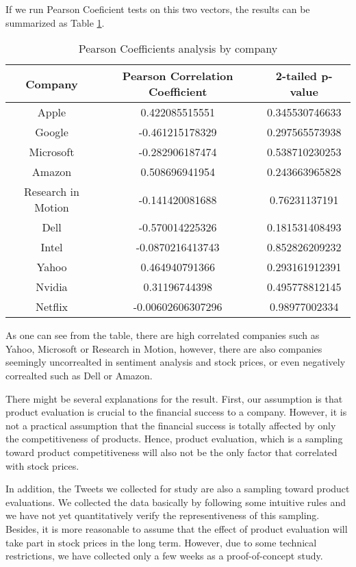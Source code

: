 \documentclass[12pt]{article}
\begin{document}
If we run Pearson Coeficient tests on this two vectors, the results can be summarized as Table \ref{coefficients-by-company}.

\begin{table}
\begin{center}
    \begin{tabular}{ | c || c | c | }
        \hline
        \textbf{Company} & \textbf{Pearson Correlation Coefficient} & \textbf{2-tailed p-value} \\ \hline
        \hline
        Apple & 0.422085515551 & 0.345530746633 \\ \hline
        Google & -0.461215178329 & 0.297565573938 \\ \hline
        Microsoft & -0.282906187474 & 0.538710230253 \\ \hline
        Amazon & 0.508696941954 & 0.243663965828 \\ \hline
        Research in Motion & -0.141420081688 & 0.76231137191 \\ \hline
        Dell & -0.570014225326 & 0.181531408493 \\ \hline
        Intel & -0.0870216413743 & 0.852826209232 \\ \hline
        Yahoo & 0.464940791366 & 0.293161912391 \\ \hline
        Nvidia & 0.31196744398 & 0.495778812145 \\ \hline
        Netflix & -0.00602606307296 & 0.98977002334 \\ \hline
    \end{tabular}
\caption{Pearson Coefficients analysis by company}
\label{coefficients-by-company}
\end{center}
\end{table}

As one can see from the table, there are high correlated companies such as Yahoo, Microsoft or Research in Motion, however, there are also companies seemingly uncorrealted in sentiment analysis and stock prices, or even negatively correalted such as Dell or Amazon.

There might be several explanations for the result. First, our assumption is that product evaluation is crucial to the financial success to a company. However, it is not a practical assumption that the financial success is totally affected by only the competitiveness of products. Hence, product evaluation, which is a sampling toward product competitiveness will also not be the only factor that correlated with stock prices.

In addition, the Tweets we collected for study are also a sampling toward product evaluations. We collected the data basically by following some intuitive rules and we have not yet quantitatively verify the representiveness of this sampling. Besides, it is more reasonable to assume that the effect of product evaluation will take part in stock prices in the long term. However, due to some technical restrictions, we have collected only a few weeks as a proof-of-concept study.
\end{document}
